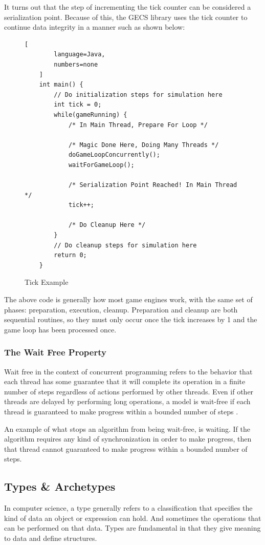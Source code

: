 It turns out that the step of incrementing the tick counter can be considered a serialization point. Because of this, the GECS library uses the tick counter to continue data integrity in a manner such as shown below:


\begin{figure}[H]
    \begin{lstlisting}[
        language=Java,
        numbers=none
    ]
    int main() {
        // Do initialization steps for simulation here
        int tick = 0;
        while(gameRunning) {
            /* In Main Thread, Prepare For Loop */    

            /* Magic Done Here, Doing Many Threads */
            doGameLoopConcurrently();
            waitForGameLoop();

            /* Serialization Point Reached! In Main Thread */
            tick++;

            /* Do Cleanup Here */
        }
        // Do cleanup steps for simulation here
        return 0;
    }
\end{lstlisting}
    \caption{Tick Example}
    \label{code:naive_ecs_data}
\end{figure}

The above code is generally how most game engines work, with the same set of phases: preparation, execution, cleanup. Preparation and cleanup are both sequential routines, so they must only occur once the tick increases by 1 and the game loop has been processed once.

\subsubsection{The Wait Free Property}
Wait free in the context of concurrent programming refers to the behavior that each thread has some guarantee that it will complete its operation in a finite number of steps regardless of actions performed by other threads. Even if other threads are delayed by performing long operations, a model is wait-free if each thread is guaranteed to make progress within a bounded number of steps \cite{Herlihy_2021b}.

An example of what stops an algorithm from being wait-free, is waiting. If the algorithm requires any kind of synchronization in order to make progress, then that thread cannot guaranteed to make progress within a bounded number of steps.

\subsection{Types \& Archetypes}
In computer science, a type generally refers to a classification that specifies the kind of data an object or expression can hold. And sometimes the operations that can be performed on that data. Types are fundamental in that they give meaning to data and define structures. 


